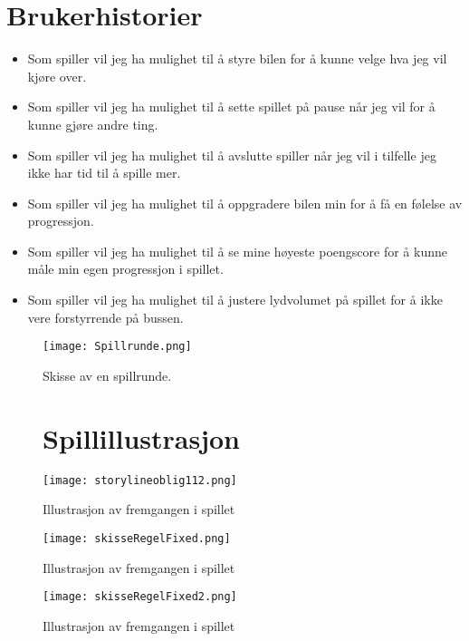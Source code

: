 \documentclass[paper=a4]{article}
\begin{document}
	\section{Brukerhistorier}
		\begin{itemize}
			\item{Som spiller vil jeg ha mulighet til å styre bilen for å kunne velge hva jeg vil kjøre over.}
			\item{Som spiller vil jeg ha mulighet til å sette spillet på pause når jeg vil for å kunne gjøre andre ting.}
			\item{Som spiller vil jeg ha mulighet til å avslutte spiller når jeg vil i tilfelle jeg ikke har tid til å spille mer.}
			\item{Som spiller vil jeg ha mulighet til å oppgradere bilen min for å få en følelse av progressjon.}
			\item{Som spiller vil jeg ha mulighet til å se mine høyeste poengscore for å kunne måle min egen progressjon i spillet.}
			\item{Som spiller vil jeg ha mulighet til å justere lydvolumet på spillet for å ikke vere forstyrrende på bussen.}
		\end{itemize}

	\newpage
	\begin{figure}\begin{center}
		\texttt{[image: Spillrunde.png]}
		\caption{Skisse av en spillrunde.}
	\end{center}\end{figure}

\begin{figure}
\section{Spillillustrasjon}
\begin{center}
\texttt{[image: storylineoblig112.png]}
\caption{Illustrasjon av fremgangen i spillet}
\end{center}\end{figure}

\begin{figure}
\begin{center}
\texttt{[image: skisseRegelFixed.png]}
\caption{Illustrasjon av fremgangen i spillet}
\texttt{[image: skisseRegelFixed2.png]}
\caption{Illustrasjon av fremgangen i spillet}
\end{center}
\end{figure}
\end{document}
